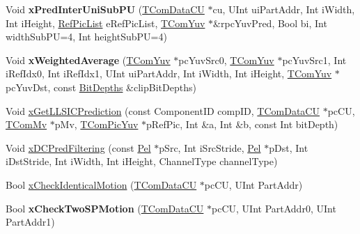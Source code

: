 \begin{DoxyCompactItemize}
\mbox{\label{class_t_com_prediction_aec9a87eb23d5cb3114147e1fe31347bc}} 
Void {\bfseries x\+Pred\+Inter\+Uni\+Sub\+PU} (\hyperlink{class_t_com_data_c_u}{T\+Com\+Data\+CU} $\ast$cu, U\+Int ui\+Part\+Addr, Int i\+Width, Int i\+Height, \hyperlink{_type_def_8h_a93cea48eb9dcfd661168dee82e41b384}{Ref\+Pic\+List} e\+Ref\+Pic\+List, \hyperlink{class_t_com_yuv}{T\+Com\+Yuv} $\ast$\&rpc\+Yuv\+Pred, Bool bi, Int width\+Sub\+PU=4, Int height\+Sub\+PU=4)
\item 
\mbox{\label{class_t_com_prediction_ab55321d5d8bcdcf5b8afc1dd1ec95fa9}} 
Void {\bfseries x\+Weighted\+Average} (\hyperlink{class_t_com_yuv}{T\+Com\+Yuv} $\ast$pc\+Yuv\+Src0, \hyperlink{class_t_com_yuv}{T\+Com\+Yuv} $\ast$pc\+Yuv\+Src1, Int i\+Ref\+Idx0, Int i\+Ref\+Idx1, U\+Int ui\+Part\+Addr, Int i\+Width, Int i\+Height, \hyperlink{class_t_com_yuv}{T\+Com\+Yuv} $\ast$pc\+Yuv\+Dst, const \hyperlink{struct_bit_depths}{Bit\+Depths} \&clip\+Bit\+Depths)
\item 
Void \hyperlink{class_t_com_prediction_a4538f283309c75fe30bd8ea44c5cfed7}{x\+Get\+L\+L\+S\+I\+C\+Prediction} (const Component\+ID comp\+ID, \hyperlink{class_t_com_data_c_u}{T\+Com\+Data\+CU} $\ast$pc\+CU, \hyperlink{class_t_com_mv}{T\+Com\+Mv} $\ast$p\+Mv, \hyperlink{class_t_com_pic_yuv}{T\+Com\+Pic\+Yuv} $\ast$p\+Ref\+Pic, Int \&a, Int \&b, const Int bit\+Depth)
\item 
Void \hyperlink{class_t_com_prediction_ad48e4196c150d1ded310988525d2b864}{x\+D\+C\+Pred\+Filtering} (const \hyperlink{_type_def_8h_af92141699657699b4b547be0c8517541}{Pel} $\ast$p\+Src, Int i\+Src\+Stride, \hyperlink{_type_def_8h_af92141699657699b4b547be0c8517541}{Pel} $\ast$p\+Dst, Int i\+Dst\+Stride, Int i\+Width, Int i\+Height, Channel\+Type channel\+Type)
\item 
Bool \hyperlink{class_t_com_prediction_ad9c1d83073b2ba0554d7ab9e8eafe7cf}{x\+Check\+Identical\+Motion} (\hyperlink{class_t_com_data_c_u}{T\+Com\+Data\+CU} $\ast$pc\+CU, U\+Int Part\+Addr)
\item 
\mbox{\label{class_t_com_prediction_ad0ce2ab8f81517f5671b96cf65ef2387}} 
Bool {\bfseries x\+Check\+Two\+S\+P\+Motion} (\hyperlink{class_t_com_data_c_u}{T\+Com\+Data\+CU} $\ast$pc\+CU, U\+Int Part\+Addr0, U\+Int Part\+Addr1)
\item 
\mbox{\label{class_t_com_prediction_a353dc63e490356d9d36159cedfadd868}} 

\end{DoxyCompactItemize}
